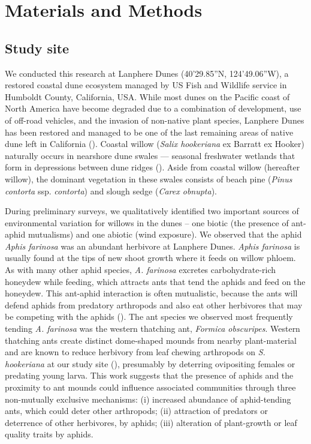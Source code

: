 \documentclass[11pt]{article}
\begin{document}

\section*{Materials and Methods}

\subsection*{Study site}

We conducted this research at Lanphere Dunes (40'29.85''N,
124'49.06''W), a restored coastal dune ecosystem managed by
US Fish and Wildlife service in Humboldt County, California, USA. While most dunes on the Pacific coast of North America have become degraded due to a combination of development, use of off-road vehicles, and the invasion of non-native plant species, Lanphere Dunes has been restored and managed to be one of the last remaining areas of native dune left in California (\citealt{Pickart2013}).
Coastal willow (\emph{Salix hookeriana} ex Barratt ex Hooker) naturally
occurs in nearshore dune swales --- seasonal freshwater wetlands that
form in depressions between dune ridges (\citealt{pickart2007beach}). Aside from
coastal willow (hereafter willow), the dominant vegetation in these
swales consists of beach pine (\emph{Pinus contorta} ssp.
\emph{contorta}) and slough sedge (\emph{Carex obnupta}).

During preliminary surveys, we qualitatively identified two important
sources of environmental variation for willows in the dunes -- one
biotic (the presence of ant-aphid mutualisms) and one abiotic (wind
exposure). We observed that the aphid \emph{Aphis farinosa} was an
abundant herbivore at Lanphere Dunes. \emph{Aphis farinosa} is usually
found at the tips of new shoot growth where it feeds on willow phloem.
As with many other aphid species, \emph{A. farinosa} excretes
carbohydrate-rich honeydew while feeding, which attracts ants that tend
the aphids and feed on the honeydew. This ant-aphid interaction is often
mutualistic, because the ants will defend aphids from predatory
arthropods and also eat other herbivores that may be competing with the
aphids (\citealt{Floate_1994, Mooney_2008}). The ant species we observed
most frequently tending \emph{A. farinosa} was the western thatching
ant, \emph{Formica obscuripes}. Western thatching ants create distinct
dome-shaped mounds from nearby plant-material and are known to reduce
herbivory from leaf chewing arthropods on \emph{S. hookeriana} at our
study site (\citealt{CRUTSINGER_2005}), presumably by deterring ovipositing
females or predating young larva. This work suggests that the presence
of aphids and the proximity to ant mounds could influence associated
communities through three non-mutually exclusive mechanisms: (i)
increased abundance of aphid-tending ants, which could deter other
arthropods; (ii) attraction of predators or deterrence of other
herbivores, by aphids; (iii) alteration of plant-growth or leaf quality
traits by aphids. 
\end{document}
